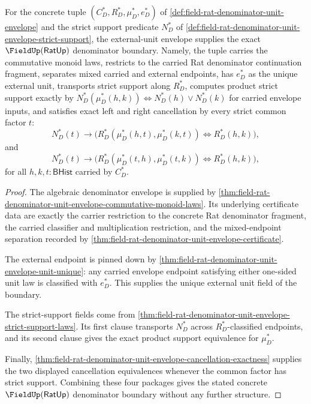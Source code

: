 

\begin{theorem}
\label{thm:field-rat-denominator-unit-envelope-exact-field-boundary}
For the concrete tuple $(C_D^\ast,R_D^\ast,\mu_D^\ast,e_D^\ast)$ of
\autoref{def:field-rat-denominator-unit-envelope} and the strict support
predicate $N_D^\ast$ of
\autoref{def:field-rat-denominator-unit-envelope-strict-support}, the
external-unit envelope supplies the exact $\FieldUp(\mathsf{RatUp})$
denominator boundary. Namely, the tuple carries the commutative monoid laws,
restricts to the carried Rat denominator continuation fragment, separates mixed
carried and external endpoints, has $e_D^\ast$ as the unique external unit,
transports strict support along $R_D^\ast$, computes product strict support
exactly by $N_D^\ast(\mu_D^\ast(h,k))\Longleftrightarrow
N_D^\ast(h)\lor N_D^\ast(k)$ for carried envelope inputs, and satisfies exact
left and right cancellation by every strict common factor $t$:
$$
N_D^\ast(t)\to
\bigl(R_D^\ast(\mu_D^\ast(h,t),\mu_D^\ast(k,t))
\Longleftrightarrow R_D^\ast(h,k)\bigr),
$$
and
$$
N_D^\ast(t)\to
\bigl(R_D^\ast(\mu_D^\ast(t,h),\mu_D^\ast(t,k))
\Longleftrightarrow R_D^\ast(h,k)\bigr),
$$
for all $h,k,t:\mathsf{BHist}$ carried by $C_D^\ast$.
\end{theorem}
\begin{proof}
The algebraic denominator envelope is supplied by
\autoref{thm:field-rat-denominator-unit-envelope-commutative-monoid-laws}. Its
underlying certificate data are exactly the carrier restriction to the concrete
Rat denominator fragment, the carried classifier and multiplication
restriction, and the mixed-endpoint separation recorded by
\autoref{thm:field-rat-denominator-unit-envelope-certificate}.

The external endpoint is pinned down by
\autoref{thm:field-rat-denominator-unit-envelope-unit-unique}: any carried
envelope endpoint satisfying either one-sided unit law is classified with
$e_D^\ast$. This supplies the unique external unit field of the boundary.

The strict-support fields come from
\autoref{thm:field-rat-denominator-unit-envelope-strict-support-laws}. Its first
clause transports $N_D^\ast$ across $R_D^\ast$-classified endpoints, and its
second clause gives the exact product support equivalence for
$\mu_D^\ast$.

Finally,
\autoref{thm:field-rat-denominator-unit-envelope-cancellation-exactness}
supplies the two displayed cancellation equivalences whenever the common factor
has strict support. Combining these four packages gives the stated concrete
$\FieldUp(\mathsf{RatUp})$ denominator boundary without any further structure.
\end{proof}


